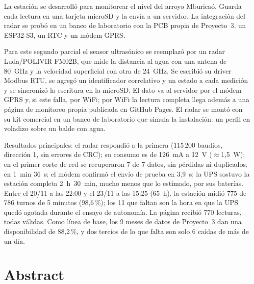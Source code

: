 \documentclass[11pt,a4paper]{article}
\begin{document}
La estación se desarrolló para monitorear el nivel del arroyo Mburicaó. Guarda
cada lectura en una tarjeta microSD y la envía a un servidor. La integración del
radar se probó en un banco de laboratorio con la PCB propia de Proyecto~3, un
ESP32-S3, un RTC y un módem GPRS.

Para este segundo parcial el sensor ultrasónico se reemplazó por un
radar Luda/POLIVIR FM02B, que mide la distancia al agua con una antena
de 80~GHz y la velocidad superficial con otra de 24~GHz. Se escribió
su driver Modbus RTU, se agregó un identificador correlativo y un
estado a cada medición y se sincronizó la escritura en la microSD. El
dato va al servidor por el módem GPRS y, si este falla, por
WiFi; por WiFi la lectura completa llega además a una
página de monitoreo propia publicada en GitHub Pages. El radar se montó
con su kit comercial en un banco de laboratorio que simula la
instalación: un perfil en voladizo sobre un balde con agua.

Resultados principales: el radar respondió a la primera (115\,200 baudios,
dirección 1, sin errores de CRC); su consumo es de 126~mA a 12~V
($\approx$1,5~W); en el primer corte de red se recuperaron 7 de 7
datos, sin pérdidas ni duplicados, en 1~min 36~s; el módem confirmó el envío
de prueba en 3,9~s; la UPS sostuvo la estación completa 2~h~30~min,
mucho menos que lo estimado, por sus baterías. Entre el 20/11 a las 22:00 y el
23/11 a las 15:25 (65~h), la estación midió 775 de 786 turnos de 5 minutos
(98,6\,\%); los 11 que faltan son la hora en que la UPS quedó agotada durante el
ensayo de autonomía. La página recibió 770 lecturas, todas válidas. Como línea de base, los 9 meses de datos de
Proyecto~3 dan una disponibilidad de 88,2\,\%, y dos tercios de lo que
falta son solo 6 caídas de más de un día.

\section{Abstract}
\end{document}

